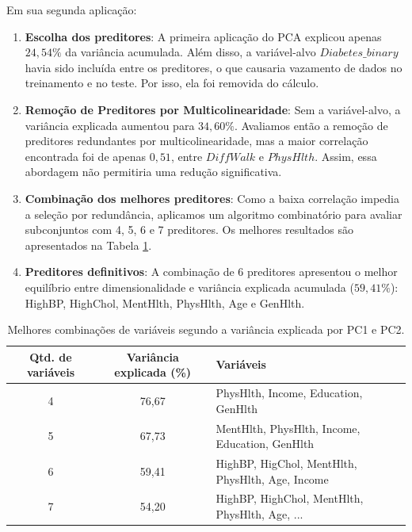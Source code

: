 \documentclass[conference]{IEEEtran}
\begin{document}
Em sua segunda aplicação:

\begin{enumerate}
  \item \textbf{Escolha dos preditores}: A primeira aplicação do PCA explicou apenas $24,54\%$ da variância acumulada. Além disso, a variável-alvo $Diabetes\_binary$ havia sido incluída entre os preditores, o que causaria vazamento de dados no treinamento e no teste. Por isso, ela foi removida do cálculo.
  
  \item \textbf{Remoção de Preditores por Multicolinearidade}: Sem a variável-alvo, a variância explicada aumentou para $34,60\%$. Avaliamos então a remoção de preditores redundantes por multicolinearidade, mas a maior correlação encontrada foi de apenas $0,51$, entre $DiffWalk$ e $PhysHlth$. Assim, essa abordagem não permitiria uma redução significativa.

  \item \textbf{Combinação dos melhores preditores}: Como a baixa correlação impedia a seleção por redundância, aplicamos um algoritmo combinatório para avaliar subconjuntos com 4, 5, 6 e 7 preditores. Os melhores resultados são apresentados na Tabela \ref{tab:melhores_combinacoes_pca}.

  \item \textbf{Preditores definitivos}: A combinação de 6 preditores apresentou o melhor equilíbrio entre dimensionalidade e variância explicada acumulada ($59,41\%$): HighBP, HighChol, MentHlth, PhysHlth, Age e GenHlth.


\end{enumerate}

\begin{table}[!t]
  \centering
  \caption{Melhores combinações de variáveis segundo a variância explicada por PC1 e PC2.}
  \label{tab:melhores_combinacoes_pca}
  \begin{tabular}{c c l}
  \hline
  \textbf{Qtd. de variáveis} &
  \textbf{Variância explicada (\%)} &
  \textbf{Variáveis} \\
  \hline

  4 & 76,67 &
  PhysHlth, Income, Education, GenHlth \\

  5 & 67,73 &
  MentHlth, PhysHlth, Income, Education, GenHlth \\

  6 & 59,41 &
  HighBP, HigChol, MentHlth, PhysHlth, Age, Income \\

  7 & 54,20 &
  HighBP, HighChol, MentHlth, PhysHlth, Age, ... \\

  \hline
  \end{tabular}
\end{table}
\FloatBarrier
\end{document}
